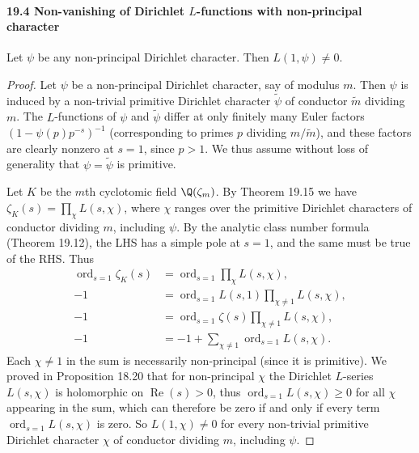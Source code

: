 \paragraph{19.4 Non-vanishing of Dirichlet $L$-functions with non-principal character}
\begin{theorem}[19.16]
Let $\psi$ be any non-principal Dirichlet character. Then $L(1,\psi)\ne0$.
\end{theorem}
\begin{proof}
Let $\psi$ be a non-principal Dirichlet character, say of modulus $m$. Then $\psi$ is induced by a non-trivial primitive Dirichlet character $\widetilde\psi$ of conductor $\widetilde m$ dividing $m$. The $L$-functions of $\psi$ and $\widetilde\psi$ differ at only finitely many Euler factors $(1-\psi(p)p^{-s})^{-1}$ (corresponding to primes $p$ dividing $m/\widetilde m$), and these factors are clearly nonzero at $s=1$, since $p>1$. We thus assume without loss of generality that $\psi=\widetilde\psi$ is primitive.

Let $K$ be the $m$th cyclotomic field $\Q(\zeta_m)$. By Theorem 19.15 we have $\zeta_K(s)=\prod_\chi L(s,\chi)$, where $\chi$ ranges over the primitive Dirichlet characters of conductor dividing $m$, including $\psi$. By the analytic class number formula (Theorem 19.12), the LHS has a simple pole at $s=1$, and the same must be true of the RHS. Thus
\begin{align*}
\operatorname{ord}_{s=1}\zeta_K(s)&=\operatorname{ord}_{s=1}\prod_\chi L(s,\chi),\\
-1&=\operatorname{ord}_{s=1}L(s,1)\prod_{\chi\ne1}L(s,\chi),\\
-1&=\operatorname{ord}_{s=1}\zeta(s)\prod_{\chi\ne1}L(s,\chi),\\
-1&=-1+\sum_{\chi\ne1}\operatorname{ord}_{s=1}L(s,\chi).
\end{align*}
Each $\chi\ne1$ in the sum is necessarily non-principal (since it is primitive). We proved in Proposition 18.20 that for non-principal $\chi$ the Dirichlet $L$-series $L(s,\chi)$ is holomorphic on $\operatorname{Re}(s)>0$, thus $\operatorname{ord}_{s=1}L(s,\chi)\geq0$ for all $\chi$ appearing in the sum, which can therefore be zero if and only if every term $\operatorname{ord}_{s=1}L(s,\chi)$ is zero. So $L(1,\chi)\ne0$ for every non-trivial primitive Dirichlet character $\chi$ of conductor dividing $m$, including $\psi$.
\end{proof}
